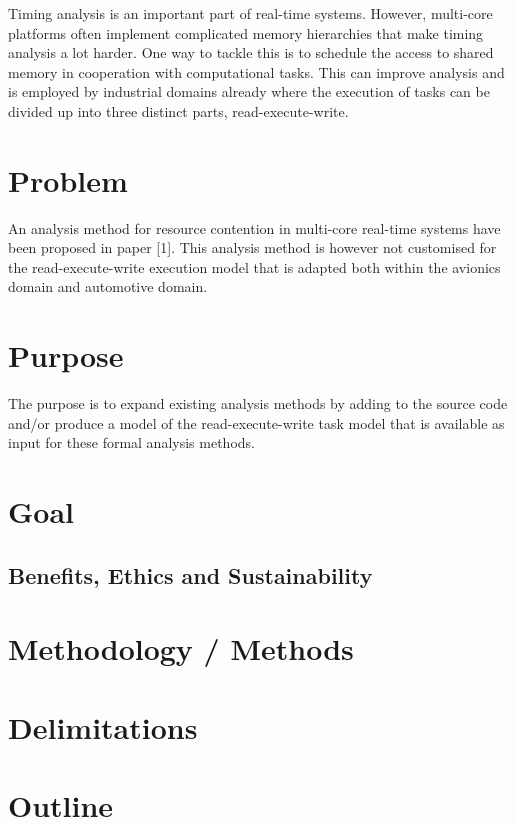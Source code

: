 \documentclass{kththesis}
\begin{document}
Timing analysis is an important part of real-time systems. However, multi-core platforms often
implement complicated memory hierarchies that make timing analysis a lot harder. One way to tackle
this is to schedule the access to shared memory in cooperation with computational tasks. This can
improve analysis and is employed by industrial domains already where the execution of tasks can be
divided up into three distinct parts, read-execute-write.


\section{Problem}

An analysis method for resource contention in multi-core real-time systems have been proposed in
paper [1]. This analysis method is however not customised for the read-execute-write execution model
that is adapted both within the avionics domain and automotive domain.


\section{Purpose}

The purpose is to expand existing analysis methods by adding to the source code and/or produce a
model of the read-execute-write task model that is available as input for these formal analysis
methods.


\section{Goal}



\subsection{Benefits, Ethics and Sustainability}

\section{Methodology / Methods}

\section{Delimitations}

\section{Outline}
\end{document}
